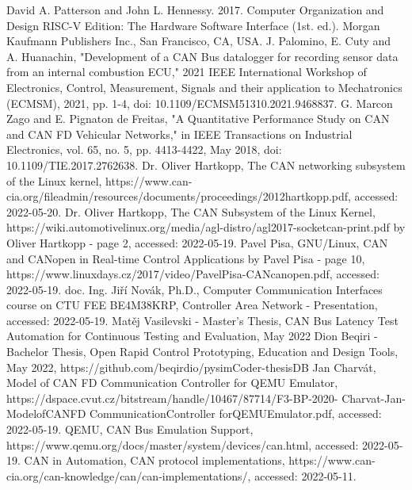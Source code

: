 \documentclass{ctuthesis}
\begin{document}
 
\renewcommand\bibname{References}
\begin{thebibliography}{1}
 David A. Patterson and John L. Hennessy. 2017. Computer Organization and Design RISC-V Edition: The Hardware Software Interface (1st. ed.). Morgan Kaufmann Publishers Inc., San Francisco, CA, USA.
 J. Palomino, E. Cuty and A. Huanachin, "Development of a CAN Bus datalogger for recording sensor data from an internal combustion ECU," 2021 IEEE International Workshop of Electronics, Control, Measurement, Signals and their application to Mechatronics (ECMSM), 2021, pp. 1-4, doi: 10.1109/ECMSM51310.2021.9468837.
 G. Marcon Zago and E. Pignaton de Freitas, "A Quantitative Performance Study on CAN and CAN FD Vehicular Networks," in IEEE Transactions on Industrial Electronics, vol. 65, no. 5, pp. 4413-4422, May 2018, doi: 10.1109/TIE.2017.2762638.
 Dr. Oliver Hartkopp, The CAN networking subsystem of the Linux kernel, https://www.can-cia.org/fileadmin/resources/documents/proceedings/2012\text{-}hartkopp.pdf, accessed: 2022-05-20.
 Dr. Oliver Hartkopp, The CAN Subsystem of the Linux Kernel, https://wiki.automotivelinux.org/\text{-}media/agl-distro/agl2017-socketcan-print.pdf by Oliver Hartkopp - page 2, accessed: 2022-05-19.
 Pavel Pisa, GNU/Linux, CAN and CANopen in Real-time Control Applications by Pavel Pisa - page 10, https://www.linuxdays.cz/2017/video/Pavel\text{-}Pisa-CAN\text{-}canopen.pdf, accessed: 2022-05-19.
 doc. Ing. Jiří Novák, Ph.D., Computer Communication Interfaces course on CTU FEE BE4M38KRP, Controller Area Network - Presentation, accessed: 2022-05-19.
 Matěj Vasilevski - Master's Thesis, CAN Bus Latency Test Automation for Continuous Testing and Evaluation, May 2022
 Dion Beqiri -Bachelor Thesis, Open Rapid Control Prototyping, Education and Design Tools, May 2022, https://github.com/beqirdio/pysimCoder-thesis\text{-}DB
 Jan Charvát, Model of CAN FD Communication Controller for QEMU Emulator, https://dspace.cvut.cz/bitstream/handle/10467/87714/F3-BP-2020-
Charvat-Jan-
Model\text{-}of\text{-}CAN\text{-}FD\text{-}
Communication\text{-}Controller\text{-}
for\text{-}QEMU\text{-}Emulator.pdf, accessed: 2022-05-19.
 QEMU, CAN Bus Emulation Support, https://www.qemu.org/docs/master/system/devices/can.html, accessed: 2022-05-19.
 CAN in Automation, CAN protocol implementations, https://www.can-cia.org/can-knowledge/can/can-implementations/, accessed: 2022-05-11.

\end{thebibliography}
\end{document}
